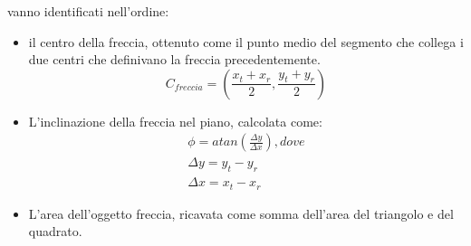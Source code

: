 vanno identificati nell'ordine:
\begin{itemize}
	\item \textbf{}il centro della freccia, ottenuto come il punto medio del segmento che collega i due centri che definivano la freccia precedentemente.
	$$
		C_{freccia}=(\dfrac{x_t+x_r}{2},\dfrac{y_t+y_r}{2})
	$$
	\item \textbf{}L'inclinazione della freccia nel piano, calcolata come:
		\begin{equation}
			\begin{split}
				\phi=atan(\frac{\Delta y}{\Delta x}), dove\\
				\Delta y=y_t-y_r\\
				\Delta x=x_t-x_r
			\end{split}
		\end{equation}
	\item \textbf{}L'area dell'oggetto freccia, ricavata come somma dell'area del triangolo e del quadrato.
	
	
	

\end{itemize}	